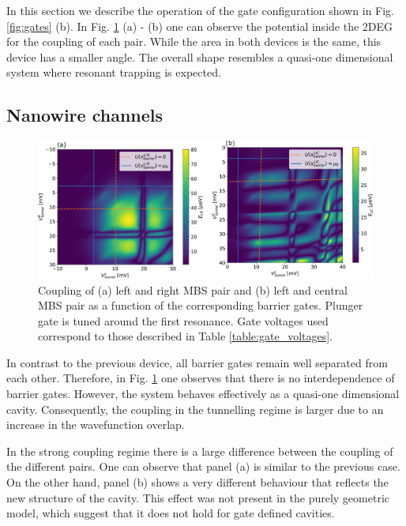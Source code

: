In this section we describe the operation of the gate configuration shown in Fig. \ref{fig:gates} (b).
In Fig.  \ref{fig:device_2_barriers} (a) - (b) one can observe the potential inside the 2DEG for the coupling of each pair.
While the area in both devices is the same, this device has a smaller angle.
The overall shape resembles a quasi-one dimensional system where resonant trapping is expected.

\subsection{Nanowire channels}

\begin{figure}[h!]
\centering
  \includegraphics[width=\linewidth]{figures/device_2_barriers.pdf}
  \caption{Coupling of (a) left and right MBS pair and (b) left and central MBS pair as a function of the corresponding barrier gates. Plunger gate is tuned around the first resonance. Gate voltages used correspond to those described in Table \ref{table:gate_voltages}.}
  \label{fig:device_2_barriers}
\end{figure}

In contrast to the previous device, all barrier gates remain well separated from each other.
Therefore, in Fig. \ref{fig:device_2_barriers} one observes that there is no interdependence of barrier gates.
However, the system behaves effectively as a quasi-one dimensional cavity.
Consequently, the coupling in the tunnelling regime is larger due to an increase in the wavefunction overlap.

In the strong coupling regime there is a large difference between the coupling of the different pairs.
One can observe that panel (a) is similar to the previous case.
On the other hand, panel (b) shows a very different behaviour that reflects the new structure of the cavity.
This effect was not present in the purely geometric model, which suggest that it does not hold for gate defined cavities.

